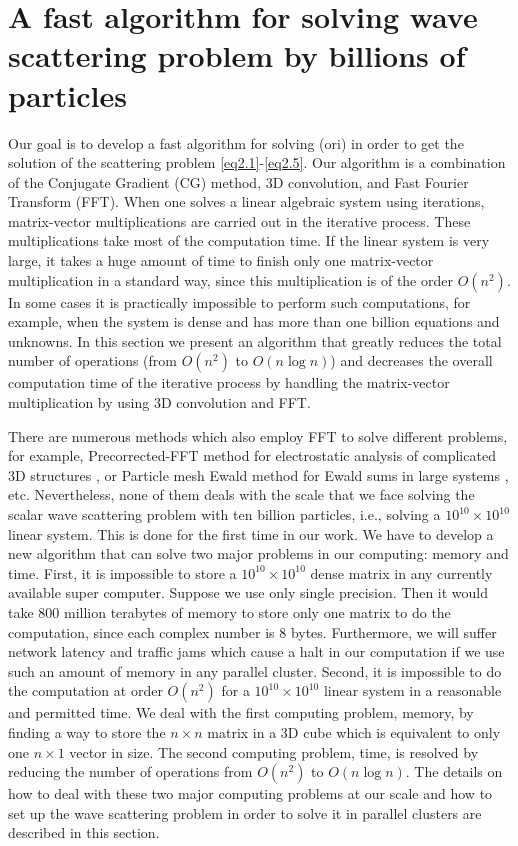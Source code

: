 \documentclass[12pt]{elsarticle}
\numberwithin{equation}{section}
\begin{document}
\section{A fast algorithm for solving wave scattering problem by billions of particles} \label{sec3}
Our goal is to develop a fast algorithm for solving (ori) in order to get the solution of the scattering problem \eqref{eq2.1}-\eqref{eq2.5}. Our algorithm is a combination of the Conjugate Gradient (CG) method, 3D convolution, and Fast Fourier Transform (FFT). When one solves a linear algebraic system using iterations, matrix-vector multiplications are carried out in the iterative process. These multiplications take most of the computation time. If the linear system is very large, it takes a huge amount of time to finish only one matrix-vector multiplication in a standard way, since this multiplication is of the order $O(n^2)$. In some cases it is practically impossible to perform such computations, for example, when the system is dense and has more than one billion equations and unknowns. In this section we present an algorithm that  greatly reduces the total number of operations (from $O(n^2)$ to $O(n\log n)$) and decreases the overall computation time of the iterative process by handling the matrix-vector multiplication by using 3D convolution and FFT.

There are numerous methods which also employ FFT to solve different problems, for example, Precorrected-FFT method for electrostatic analysis of complicated 3D structures \cite{PhilWhite}, or Particle mesh Ewald method for Ewald sums in large systems \cite{DardenYorkPedersen}, etc. Nevertheless, none of them deals with the scale that we face solving the scalar wave scattering problem with ten billion particles, i.e., solving a $10^{10} \times 10^{10}$ linear system. This is done for the first time in our work.  We have to develop a new algorithm that can solve two major problems in our computing: memory and time. First, it is impossible to store a $10^{10} \times 10^{10}$ dense matrix in any currently available super computer. Suppose we use only single precision. Then it would take 800 million terabytes of memory to store only one matrix to do the computation, since each complex number is 8 bytes. Furthermore, we will suffer network latency and traffic jams which cause a halt in our computation if we use such an amount of memory in any parallel cluster. Second, it is impossible to do the computation at order $O(n^2)$ for a $10^{10} \times 10^{10}$ linear system in a reasonable and permitted time. We deal with the first computing problem, memory, by finding a way to store the $n \times n$ matrix in a 3D cube which is equivalent to only one $n \times 1$ vector in size. The second computing problem, time, is resolved by reducing the number of operations from $O(n^2)$ to $O(n\log n)$. The details on how to deal with these two major computing problems at our scale and how to set up the wave scattering problem in order to solve it in parallel clusters are described in this section.
\end{document}
